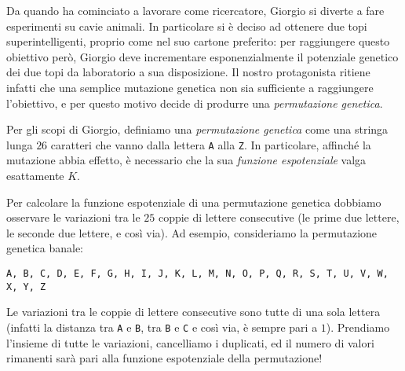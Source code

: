 \usepackage{xcolor}
\usepackage{afterpage}
\usepackage{pifont,mdframed}
\usepackage[bottom]{footmisc}

\makeatletter
\gdef\this@inputfilename{input.txt}
\gdef\this@outputfilename{output.txt}
\makeatother

\newcommand{\inputfile}{\texttt{input.txt}}
\newcommand{\outputfile}{\texttt{output.txt}}

\newenvironment{warning}
  {\par\begin{mdframed}[linewidth=2pt,linecolor=gray]%
    \begin{list}{}{\leftmargin=1cm
                   \labelwidth=\leftmargin}\item[\Large\ding{43}]}
  {\end{list}\end{mdframed}\par}

Da quando ha cominciato a lavorare come ricercatore, Giorgio si diverte a fare esperimenti su cavie animali. In particolare si è deciso ad ottenere due topi superintelligenti, proprio come nel suo cartone preferito: per raggiungere questo obiettivo però, Giorgio deve incrementare esponenzialmente il potenziale genetico dei due topi da laboratorio a sua disposizione. Il nostro protagonista ritiene infatti che una semplice mutazione genetica non sia sufficiente a raggiungere l'obiettivo, e per questo motivo decide di produrre una \emph{permutazione genetica}.

Per gli scopi di Giorgio, definiamo una \emph{permutazione genetica} come una stringa lunga $26$ caratteri che vanno dalla lettera \texttt{A} alla \texttt{Z}. In particolare, affinché la mutazione abbia effetto, è necessario che la sua \emph{funzione espotenziale} valga esattamente $K$.

Per calcolare la funzione espotenziale di una permutazione genetica dobbiamo osservare le variazioni tra le $25$ coppie di lettere consecutive (le prime due lettere, le seconde due lettere, e così via). Ad esempio, consideriamo la permutazione genetica banale:

\begin{center}
\texttt{A, B, C, D, E, F, G, H, I, J, K, L, M, N, O, P, Q, R, S, T, U, V, W, X, Y, Z}
\end{center}

Le variazioni tra le coppie di lettere consecutive sono tutte di una sola lettera (infatti la distanza tra \texttt{A} e \texttt{B}, tra \texttt{B} e \texttt{C} e così via, è sempre pari a $1$). Prendiamo l'insieme di tutte le variazioni, cancelliamo i duplicati, ed il numero di valori rimanenti sarà pari alla funzione espotenziale della permutazione!

